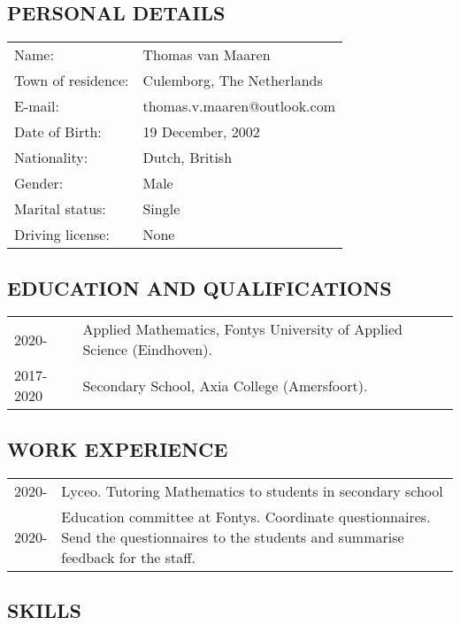 \documentclass[titlepage]{article}
\begin{document}
\subsection{PERSONAL DETAILS}

\begin{tabular}{l l}

	Name:			&	Thomas van Maaren \\
	Town of residence:	&	Culemborg, The Netherlands \\
	E-mail:			&	thomas.v.maaren@outlook.com \\
	Date of Birth:		&	19 December, 2002 \\
	Nationality:		&       Dutch, British \\
	Gender:			&	Male \\
	Marital status:		&	Single \\
	Driving license:	&	None \\

\end{tabular}

\subsection{EDUCATION AND QUALIFICATIONS}

\begin{tabular}{l p{10cm}}
	2020-		&Applied Mathematics, Fontys University of Applied Science (Eindhoven).\\
	2017-2020	&Secondary School, Axia College (Amersfoort).\\

\end{tabular}

\subsection{WORK EXPERIENCE}

\begin{tabular}{l p{10cm}}
	2020-		&Lyceo. Tutoring Mathematics to students in secondary school\\
	2020-		&Education committee at Fontys. Coordinate
			questionnaires. Send the questionnaires to the students and summarise
			feedback for the staff.\\
\end{tabular}


\subsection{SKILLS}
\end{document}

